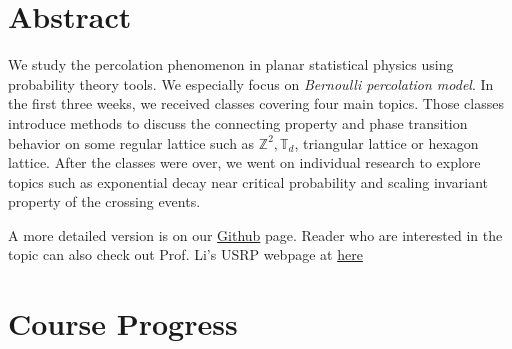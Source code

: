 \documentclass[12pt]{article}
\author{ Shi-Hong, Su\\ Yan-Wei, Su\\Chia-Cheng, Hao\\ Le-Rong, Hsu\\ Wei-Chieh, Hung\\}
\theoremstyle{plane}
\theoremstyle{definition}
\begin{document}
\clearpage\maketitle
\thispagestyle{empty}

\newpage
\setcounter{page}{1}
\section{Abstract}
We study the percolation phenomenon in planar statistical physics using probability theory tools. We especially focus on \textit{Bernoulli percolation model}. 
In the first three weeks, we received classes covering four main topics. Those classes introduce methods to discuss the connecting property and phase transition behavior on some regular lattice such as $\mathbb{Z}^2,\mathbb{T}_d$, triangular lattice or hexagon lattice. 
After the classes were over, we went on individual research to explore topics such as exponential decay near critical probability and scaling invariant property of the crossing events.

A more detailed version is on our \href{https://github.com/ausernamess/2022USRP-Group-7/blob/main/main.pdf}{Github} page. Reader who are interested in the topic can also check out Prof. Li's USRP webpage at \href{https://usrp2022.cadlag.space/}{here}
\section{Course Progress}

\setcounter{subsection}{-1}
\end{document}
